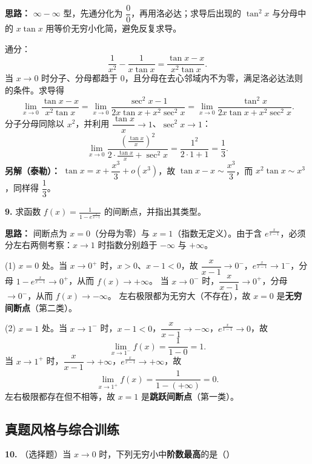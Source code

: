 \ifshowsolutions%
\textbf{思路：} $\infty-\infty$ 型，先通分化为 $\dfrac00$，再用洛必达；求导后出现的 $\tan^2x$ 与分母中的 $x\tan x$ 用等价无穷小化简，避免反复求导。

通分：
\[
\frac{1}{x^2}-\frac{1}{x\tan x}
=\frac{\tan x-x}{x^2\tan x}.
\]
当 $x\to0$ 时分子、分母都趋于 $0$，且分母在去心邻域内不为零，满足洛必达法则的条件。求导得
\[
\lim_{x\to0}\frac{\tan x-x}{x^2\tan x}
=\lim_{x\to0}\frac{\sec^2x-1}{2x\tan x+x^2\sec^2x}
=\lim_{x\to0}\frac{\tan^2x}{2x\tan x+x^2\sec^2x}.
\]
分子分母同除以 $x^2$，并利用 $\dfrac{\tan x}{x}\to1$、$\sec^2x\to1$：
\[
\lim_{x\to0}\frac{\left(\frac{\tan x}{x}\right)^2}{2\cdot\frac{\tan x}{x}+\sec^2x}
=\frac{1^2}{2\cdot1+1}=\frac13 .
\]
\textbf{另解（泰勒）：} $\tan x=x+\dfrac{x^3}{3}+o(x^3)$，故 $\tan x-x\sim\dfrac{x^3}{3}$，而 $x^2\tan x\sim x^3$，同样得 $\dfrac13$。


\else \answerarea[10] \fi%

\textbf{9.} 求函数 $\displaystyle f(x)=\frac{1}{1-e^{\frac{x}{x-1}}}$ 的间断点，并指出其类型。

\ifshowsolutions%
\textbf{思路：} 间断点为 $x=0$（分母为零）与 $x=1$（指数无定义）。由于含 $e^{\frac{x}{x-1}}$，必须分左右两侧考察：$x\to1$ 时指数分别趋于 $-\infty$ 与 $+\infty$。

(1) $x=0$ 处。当 $x\to0^+$ 时，$x>0$、$x-1<0$，故 $\dfrac{x}{x-1}\to0^-$，$e^{\frac{x}{x-1}}\to1^-$，分母 $1-e^{\frac{x}{x-1}}\to0^+$，从而 $f(x)\to+\infty$。
当 $x\to0^-$ 时，$\dfrac{x}{x-1}\to0^+$，分母 $\to0^-$，从而 $f(x)\to-\infty$。
左右极限都为无穷大（不存在），故 $x=0$ 是\textbf{无穷间断点}（第二类）。

(2) $x=1$ 处。当 $x\to1^-$ 时，$x-1<0$，$\dfrac{x}{x-1}\to-\infty$，$e^{\frac{x}{x-1}}\to0$，故
\[
\lim_{x\to1^-}f(x)=\frac{1}{1-0}=1 .
\]
当 $x\to1^+$ 时，$\dfrac{x}{x-1}\to+\infty$，$e^{\frac{x}{x-1}}\to+\infty$，故
\[
\lim_{x\to1^+}f(x)=\frac{1}{1-(+\infty)}=0 .
\]
左右极限都存在但不相等，故 $x=1$ 是\textbf{跳跃间断点}（第一类）。


\else \answerarea[12] \fi%

\subsection{真题风格与综合训练}

\textbf{10.} （选择题）当 $x\to0$ 时，下列无穷小中\textbf{阶数最高}的是（\quad）

